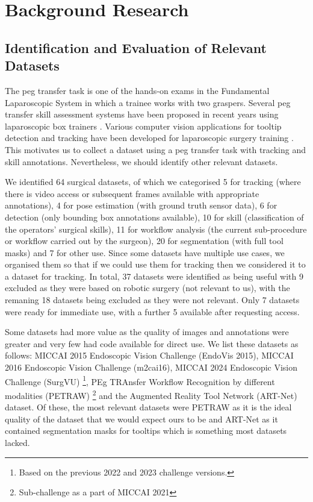 \section{Background Research}

\subsection{Identification and Evaluation of Relevant Datasets}

The peg transfer task is one of the hands-on exams in the Fundamental Laparoscopic System \cite{maciel_development_2008, matsumoto_laparoscopic_2022, Rashidi_Fathabadi_Grantner_Shebrain_Abdel} in which a trainee works with two graspers. Several peg transfer skill assessment systems have been proposed in recent years using laparoscopic box trainers \cite{Rashidi_Fathabadi_Grantner_Shebrain_Abdel}. Various computer vision applications for tooltip detection and tracking have been developed for laparoscopic surgery training \cite{matsumoto_laparoscopic_2022}. This motivates us to collect a dataset using a peg transfer task with tracking and skill annotations. Nevertheless, we should identify other relevant datasets.


We identified 64 surgical datasets, of which we categorised 5 for tracking (where there is video access or subsequent frames available with appropriate annotations), 4 for pose estimation (with ground truth sensor data), 6 for detection (only bounding box annotations available), 10 for skill (classification of the operators' surgical skills), 11 for workflow analysis (the current sub-procedure or workflow carried out by the surgeon), 20 for segmentation (with full tool masks) and 7 for other use. Since some datasets have multiple use cases, we organised them so that if we could use them for tracking then we considered it to a dataset for tracking. In total, 37 datasets were identified as being useful with 9 excluded as they were based on robotic surgery (not relevant to us), with the remaning 18 datasets being excluded as they were not relevant. Only 7 datasets were ready for immediate use, with a further 5 available after requesting access.

Some datasets had more value as the quality of images and annotations were greater and very few had code available for direct use. We list these datasets as follows: MICCAI 2015 Endoscopic Vision Challenge (EndoVis 2015), MICCAI 2016 Endoscopic Vision Challenge (m2cai16), MICCAI 2024 Endoscopic Vision Challenge (SurgVU) \footnote{Based on the previous 2022 and 2023 challenge versions.}, PEg TRAnsfer Workflow Recognition by different modalities (PETRAW) \footnote{Sub-challenge as a part of MICCAI 2021} and the Augmented Reality Tool Network (ART-Net) dataset. Of these, the most relevant datasets were PETRAW as it is the ideal quality of the dataset that we would expect ours to be and ART-Net as it contained segmentation masks for tooltips which is something most datasets lacked.

